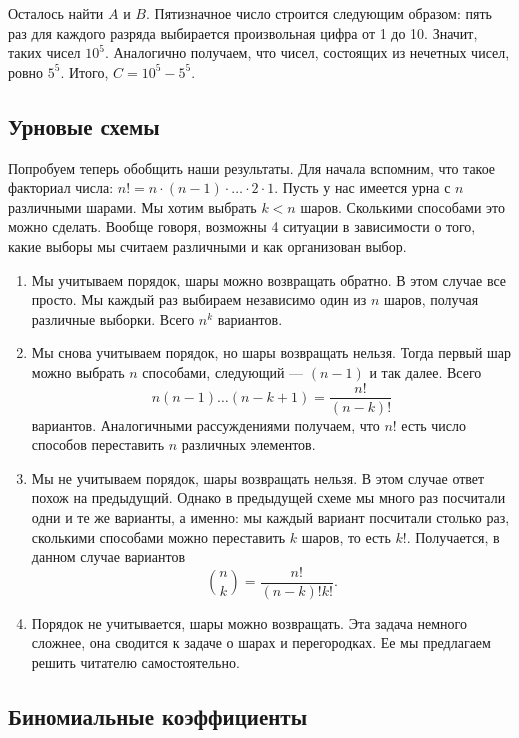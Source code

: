 Осталось найти $A$ и $B$. Пятизначное число строится следующим
образом: пять раз для каждого разряда выбирается произвольная цифра
от 1 до 10. Значит, таких чисел $10^5$. Аналогично получаем, что
чисел, состоящих из нечетных чисел, ровно $5^5$. Итого, $C = 10^5
-5^5$.

\subsection{Урновые схемы}

Попробуем теперь обобщить наши результаты. Для начала вспомним, что
такое факториал числа: $n! = n\cdot (n-1) \cdot \ldots \cdot 2 \cdot 
1$. Пусть у нас имеется урна с $n$ различными шарами. Мы хотим выбрать 
$k < n$ шаров. Сколькими способами это можно сделать. Вообще говоря,
возможны 4 ситуации в зависимости о того, какие выборы мы считаем
различными и как организован выбор.
\begin{enumerate}
    \item Мы учитываем порядок, шары можно возвращать обратно. В этом
        случае все просто. Мы каждый раз выбираем независимо один из
        $n$ шаров, получая различные выборки. Всего $n^k$ вариантов.
    \item Мы снова учитываем порядок, но шары возвращать нельзя.
        Тогда первый шар можно выбрать $n$ способами, следующий ---
        $(n-1)$ и так далее. Всего
        \[
            n(n-1)\ldots (n-k+1) = \frac{n!}{(n-k)!}
            \]
        вариантов. Аналогичными рассуждениями получаем, что $n!$
        есть число способов переставить $n$ различных элементов.
    \item Мы не учитываем порядок, шары возвращать нельзя. В этом
        случае ответ похож на предыдущий. Однако в предыдущей схеме
        мы много раз посчитали одни и те же варианты, а именно: мы
        каждый вариант посчитали столько раз, сколькими способами
        можно переставить $k$ шаров, то есть $k!$. Получается, в
        данном случае вариантов
        \[
            \binom{n}{k} = \frac{n!}{(n-k)!k!}.
            \]
    \item Порядок не учитывается, шары можно возвращать. Эта задача
        немного сложнее, она сводится к задаче о шарах и перегородках.
        Ее мы предлагаем решить читателю самостоятельно.
\end{enumerate}

\subsection{Биномиальные коэффициенты}

